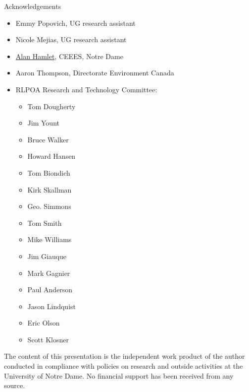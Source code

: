 \documentclass[compress,english]{beamer}
\begin{document}
\begin{frame}{Acknowledgements}
\begin{small}
\begin{itemize}
\item Emmy Popovich, UG research assistant
\item Nicole Mejias, UG research assistant
\item \href{http://engineering.nd.edu/profiles/ahamlet/}{Alan Hamlet}, CEEES, Notre Dame
\item Aaron Thompson, Directorate Environment Canada
\item RLPOA Research and Technology Committee:
\begin{multicols}{3}
\begin{itemize}
\item Tom Dougherty
\item Jim Yount
\item Bruce Walker
\item Howard Hansen
\item Tom Biondich
\item Kirk Skallman
\item Geo. Simmons
\item Tom Smith
\item Mike Williams
\item Jim Giauque
\item Mark Gagnier
\item Paul Anderson
\item Jason Lindquist
\item Eric Olson
\item Scott Klosner
\end{itemize}
\end{multicols}
\end{itemize}
\end{small}

\begin{footnotesize}
The content of this presentation is the independent work product of the author conducted in compliance with policies on research and outside activities at the University of Notre Dame. No financial support has been received from any source.
\end{footnotesize}

\end{frame}
\end{document}
